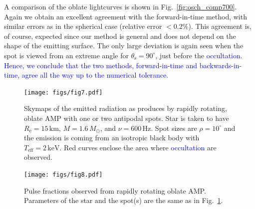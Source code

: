 \documentclass{aa}
\newcommand{\refe}[1]{\textcolor{blue}{{#1}}}
\newcommand{\refedel}[1]{}
\newcommand{\Msun}{\ensuremath{M_{\odot}}}
\begin{document}
A comparison of the oblate lightcurves is shown in Fig.~\ref{fig:osch_comp700}.
Again we obtain an excellent agreement with the forward-in-time method, with similar errors as in the spherical case (relative error $< 0.2\%$).
This agreement is, of course, expected since our method is general and does not depend on the shape of the emitting surface.
The only large deviation is again seen when the spot is viewed from an extreme angle for $\theta_{\mathrm{s}} = 90^{\circ}$, just before the \refedel{eclipse}\refe{occultation}.
\refe{Hence, we conclude that the two methods, forward-in-time and backwards-in-time, agree all the way up to the numerical tolerance.}



\begin{figure}
\texttt{[image: figs/fig7.pdf]}
\caption{\label{fig:skymap}
    Skymaps of the emitted radiation as produces by rapidly rotating, oblate AMP with one or two antipodal spots.
    Star is taken to have $R_{\mathrm{e}} = 15\,\mathrm{km}$, $M=1.6\,\Msun$, and $\nu = 600\,\mathrm{Hz}$.
    Spot sizes are $\rho = 10^{\circ}$ and the emission is coming from an isotropic black body with $T_{\mathrm{eff}} = 2\,\mathrm{keV}$.
    Red curves enclose the area where \refedel{eclipses}\refe{occultation} are observed.
  }
\end{figure}

\begin{figure}
\texttt{[image: figs/fig8.pdf]}
\caption{\label{fig:pulsefracs}
    Pulse fractions observed from rapidly rotating oblate AMP.
    Parameters of the star and the spot(s) are the same as in Fig.~\ref{fig:skymap}.
  }
\end{figure}
\end{document}
